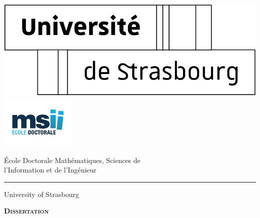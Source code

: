 \newcommand{\thetitle}{New radiomics approaches \\ \vspace{-0.2pt}
for hepatic tumor characterization \\ \vspace{-8pt} by imaging analysis}
%
\begin{titlingpage} 
	\renewcommand{\baselinestretch}{0}
	\renewcommand{\arraystretch}{0.75}
	
	\hspace{-.7cm}
	\includegraphics[width=.23\linewidth]{Logo/logo_unistra}\hfill
	\includegraphics[width=0.27\textwidth]{Logo/logo_msii}
	\begin{minipage}{\linewidth}
	\end{minipage}
	
	\begin{center}
		{\LARGE \'{E}cole Doctorale Math\'{e}matiques, Sciences de \\l'Information et de l'Ing\'{e}nieur}
		\vspace{.5mm}
		\hrule
		\vspace{2.5mm}
		{\LARGE  University of Strasbourg}
		
		\vspace{1\baselineskip}
		
		{\LARGE \textbf {\textsc{Dissertation}}}
		

\end{center}
\end{titlingpage}

